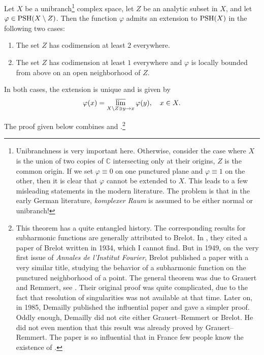 \begin{theorem}\label{thm:GRexten2}
Let $X$ be a unibranch\footnote{Unibranchness is very important here. Otherwise, consider the case where $X$ is the union of two copies of $\mathbb{C}$ intersecting only at their origins, $Z$ is the common origin. If we set $\varphi\equiv 0$ on one punctured plane and $\varphi\equiv 1$ on the other, then it is clear that $\varphi$ cannot be extended to $X$. This leads to a few misleading statements in the modern literature. The problem is that in the early German literature, \emph{komplexer Raum} is assumed to be either normal or unibranch!} complex space, let $Z$ be an analytic subset in $X$, and let $\varphi\in \mathrm{PSH}(X\setminus Z)$. Then the function $\varphi$ admits an extension to $\mathrm{PSH}(X)$ in the following two cases:
    \begin{enumerate}
        \item\label{itm:thm:GRexten2:1} The set $Z$ has codimension at least $2$ everywhere.
        \item\label{itm:thm:GRexten2:2} The set $Z$ has codimension at least $1$ everywhere and $\varphi$ is locally bounded from above on an open neighborhood of $Z$.
    \end{enumerate}
    In both cases, the extension is unique and is given by
    \begin{equation}\label{eq:GRextvarphi}
    \varphi(x)=\varlimsup_{X\setminus Z\ni y\to x}\varphi(y),\quad x\in X.
    \end{equation}
\end{theorem}
The proof given below combines \cite[Théorème~1.7]{Dem85} and \cite{GR56}.\footnote{This theorem has a quite entangled history. The corresponding results for subharmonic functions are generally attributed to Brelot. In \cite{GR56}, they cited a paper of Brelot written in 1934, which I cannot find. But in 1949, on the very first issue of \emph{Annales de l'Institut Fourier}, Brelot published a paper \cite{Bre49} with a very similar title, studying the behavior of a subharmonic function on the punctured neighborhood of a point. The general theorem was due to Grauert and Remmert, see \cite{GR56}. Their original proof was quite complicated, due to the fact that resolution of singularities was not available at that time. Later on, in 1985, Demailly published the influential paper \cite{Dem85} and gave a simpler proof. Oddly enough, Demailly did not cite either Grauert--Remmert or Brelot. He did not even mention that this result was already proved by Grauert--Remmert. The paper \cite{Dem85} is so influential that in France few people know the existence of \cite{GR56}.}


